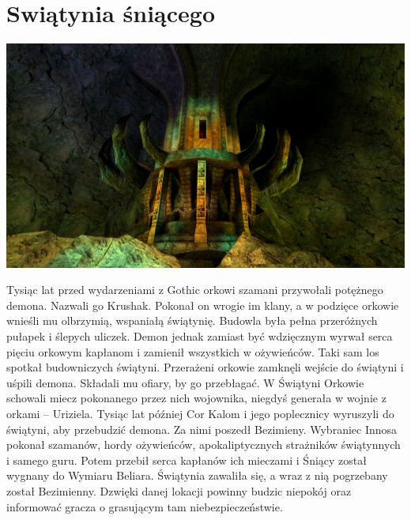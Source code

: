 \documentclass[11pt,polish, openany]{book}
\begin{document}
\section{Swiątynia śniącego}
\begin{center}
	\includegraphics[scale=0.25]{swiatyniasniacego}
\end{center}
Tysiąc lat przed wydarzeniami z Gothic orkowi szamani przywołali potężnego demona. Nazwali go Krushak. Pokonał on wrogie im klany, a w podzięce orkowie wnieśli mu olbrzymią, wspaniałą świątynię. Budowla była pełna przeróżnych pułapek i ślepych uliczek. Demon jednak zamiast być wdzięcznym wyrwał serca pięciu orkowym kapłanom i zamienił wszystkich w ożywieńców. Taki sam los spotkał budowniczych świątyni. Przerażeni orkowie zamknęli wejście do świątyni i uśpili demona. Składali mu ofiary, by go przebłagać. W Świątyni Orkowie schowali miecz pokonanego przez nich wojownika, niegdyś generała w wojnie z orkami – Uriziela. Tysiąc lat później Cor Kalom i jego poplecznicy wyruszyli do świątyni, aby przebudzić demona. Za nimi poszedł Bezimieny. Wybraniec Innosa pokonał szamanów, hordy ożywieńców, apokaliptycznych strażników świątynnych i samego guru. Potem przebił serca kapłanów ich mieczami i Śniący został wygnany do Wymiaru Beliara. Świątynia zawaliła się, a wraz z nią pogrzebany został Bezimienny.
Dzwięki danej lokacji powinny budzic niepokój oraz informować gracza o grasującym tam niebezpieczeństwie.
\end{document}
